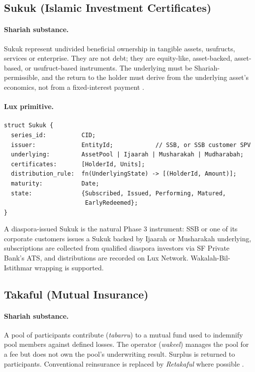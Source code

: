 \documentclass[11pt,letterpaper]{article}
\begin{document}
\subsection{Sukuk (Islamic Investment Certificates)}

\paragraph{Shariah substance.} Sukuk represent undivided beneficial
ownership in tangible assets, usufructs, services or enterprise. They
are not debt; they are equity-like, asset-backed, asset-based, or
usufruct-based instruments. The underlying must be Shariah-permissible,
and the return to the holder must derive from the underlying asset's
economics, not from a fixed-interest payment \cite{aaoifi_standards}.

\paragraph{Lux primitive.}
\begin{verbatim}
struct Sukuk {
  series_id:          CID;
  issuer:             EntityId;            // SSB, or SSB customer SPV
  underlying:         AssetPool | Ijaarah | Musharakah | Mudharabah;
  certificates:       [HolderId, Units];
  distribution_rule:  fn(UnderlyingState) -> [(HolderId, Amount)];
  maturity:           Date;
  state:              {Subscribed, Issued, Performing, Matured,
                       EarlyRedeemed};
}
\end{verbatim}

A diaspora-issued Sukuk is the natural Phase 3 instrument: SSB or one
of its corporate customers issues a Sukuk backed by Ijaarah or
Musharakah underlying, subscriptions are collected from qualified
diaspora investors via SF Private Bank's ATS, and distributions are
recorded on Lux Network. Wakalah-Bil-Istithmar wrapping is supported.

\subsection{Takaful (Mutual Insurance)}

\paragraph{Shariah substance.} A pool of participants contribute
(\emph{tabarru}) to a mutual fund used to indemnify pool members
against defined losses. The operator (\emph{wakeel}) manages the pool
for a fee but does not own the pool's underwriting result.
Surplus is returned to participants. Conventional reinsurance is
replaced by \emph{Retakaful} where possible \cite{aaoifi_standards}.
\end{document}
